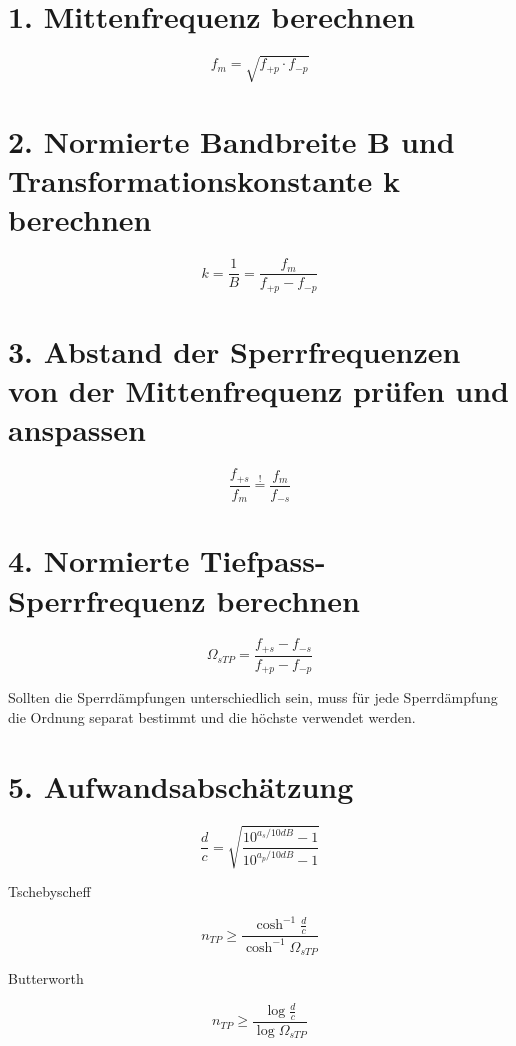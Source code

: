 \documentclass[a4paper, 12pt]{report}
\begin{document}
\section*{1. Mittenfrequenz berechnen}
	\[ f_m = \sqrt{f_{+p} \cdot f_{-p}} \]
	
\section*{2. Normierte Bandbreite B und Transformationskonstante k berechnen}
	\[ k = \frac{1}{B} = \frac{f_m}{f_{+p} - f_{-p}} \]
	
\section*{3. Abstand der Sperrfrequenzen von der Mittenfrequenz prüfen und anspassen}
	\[ \frac{f_{+s}}{f_m} \stackrel{!}{=} \frac{f_m}{f_{-s}} \]
	
\section*{4. Normierte Tiefpass-Sperrfrequenz berechnen}
	\begin{minipage}[t]{0.5\textwidth}
		\[ \Omega_{sTP} = \frac{f_{+s} - f_{-s}}{f_{+p} - f_{-p}} \]
	\end{minipage} 
	\begin{minipage}[t]{0.5\textwidth}
		Sollten die Sperrdämpfungen unterschiedlich sein, muss für jede Sperrdämpfung die Ordnung separat bestimmt und die höchste verwendet werden. 
	\end{minipage} 
	
\vspace{-0.5cm}

\section*{5. Aufwandsabschätzung}
	\vspace{-0.5cm}
	\begin{minipage}[t]{0.33\textwidth} 
			\[  \frac{d}{c} = \sqrt{\frac{10^{a_s / 10dB} - 1}{10^{a_p / 10dB} - 1}}  \]
	\end{minipage} 
	\begin{minipage}[t]{0.33\textwidth} 
			\begin{center}
			Tschebyscheff
			\end{center}
			\[ n_{TP} \ge \frac{\cosh^{-1}{\frac{d}{c}}}{\cosh^{-1}{\Omega_{sTP}}} \]
	\end{minipage}
	\begin{minipage}[t]{0.33\textwidth} 
			\begin{center}
			Butterworth
			\end{center}
			\[ n_{TP} \ge \frac{\log{\frac{d}{c}}}{\log{\Omega_{sTP}}} \]
	\end{minipage}
	
\end{document}
